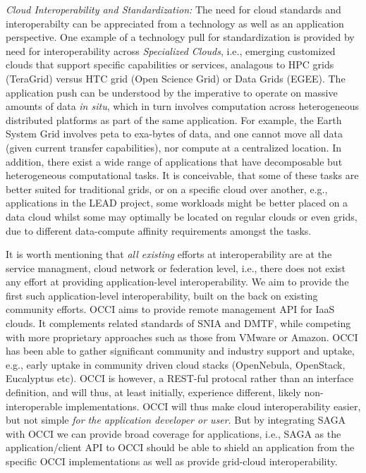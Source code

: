 \documentclass[10pt,conference,final,letterpaper,twoside,twocolumn,]{IEEEtran}
\begin{document}
{\it Cloud Interoperability and Standardization:} The need for cloud
standards and interoperabilty can be appreciated from a technology as
well as an application perspective. One example of a technology pull
for standardization is provided by need for interoperability across
{\it Specialized Clouds}, i.e., emerging customized clouds that
support specific capabilities or services, analagous to HPC grids
(TeraGrid) versus HTC grid (Open Science Grid) or Data Grids (EGEE).
The application push can be understood by the imperative to operate on
massive amounts of data {\it in situ}, which in turn involves
computation across heterogeneous distributed platforms as part of the
same application.  For example, the Earth System Grid involves peta to
exa-bytes of data, and one cannot move all data (given current
transfer capabilities), nor compute at a centralized location.  In
addition, there exist a wide range of applications that have
decomposable but heterogeneous computational tasks. It is conceivable,
that some of these tasks are better suited for traditional grids, or
on a specific cloud over another, e.g., applications in the LEAD
project, some workloads might be better placed on a data cloud whilst
some may optimally be located on regular clouds or even grids, due to
different data-compute affinity requirements amongst the tasks.

It is worth mentioning that {\it all existing} efforts at
interoperability are at the service managment, cloud network or
federation level, i.e., there does not exist any effort at providing
application-level interoperability. We aim to provide the first such
application-level interoperability, built on the back on existing
community efforts.  OCCI aims to provide remote management API for
IaaS clouds. It complements related standards of SNIA and DMTF, while
competing with more proprietary approaches such as those from VMware
or Amazon.  OCCI has been able to gather significant community and
industry support and uptake, e.g., early uptake in community driven
cloud stacks (OpenNebula, OpenStack, Eucalyptus etc).  OCCI is
however, a REST-ful protocal rather than an interface definition, and
will thus, at least initially, experience different, likely
non-interoperable implementations.  OCCI will thus make cloud
interoperability easier, but not simple {\it for the application
  developer or user}.  But by integrating SAGA with OCCI we can
provide broad coverage for applications, i.e., SAGA as the
application/client API to OCCI should be able to shield an application
from the specific OCCI implementations as well as provide grid-cloud
interoperability.
\end{document}
